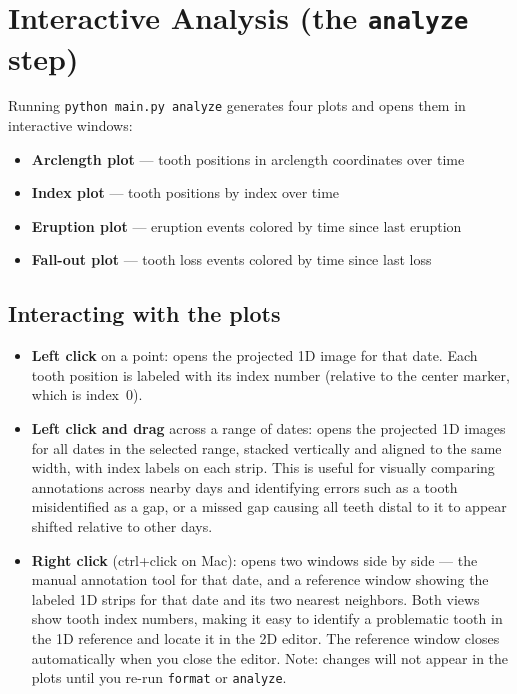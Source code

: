 \documentclass[11pt, letterpaper]{article}
\begin{document}
\section{Interactive Analysis (the \texttt{analyze} step)}

Running \texttt{python main.py analyze} generates four plots and opens them in
interactive windows:

\begin{itemize}[leftmargin=*]
  \item \textbf{Arclength plot} --- tooth positions in arclength coordinates over time
  \item \textbf{Index plot} --- tooth positions by index over time
  \item \textbf{Eruption plot} --- eruption events colored by time since last eruption
  \item \textbf{Fall-out plot} --- tooth loss events colored by time since last loss
\end{itemize}

\subsection*{Interacting with the plots}

\begin{itemize}[leftmargin=*]
  \item \textbf{Left click} on a point: opens the projected 1D image for that date.
        Each tooth position is labeled with its index number (relative to the center
        marker, which is index~0).
  \item \textbf{Left click and drag} across a range of dates: opens the projected 1D
        images for all dates in the selected range, stacked vertically and aligned to
        the same width, with index labels on each strip. This is useful for visually
        comparing annotations across nearby days and identifying errors such as a tooth
        misidentified as a gap, or a missed gap causing all teeth distal to it to appear
        shifted relative to other days.
  \item \textbf{Right click} (ctrl+click on Mac): opens two windows side by side ---
        the manual annotation tool for that date, and a reference window showing the
        labeled 1D strips for that date and its two nearest neighbors. Both views show
        tooth index numbers, making it easy to identify a problematic tooth in the 1D
        reference and locate it in the 2D editor. The reference window closes
        automatically when you close the editor. Note: changes will not appear in the
        plots until you re-run \texttt{format} or \texttt{analyze}.
\end{itemize}
\end{document}
